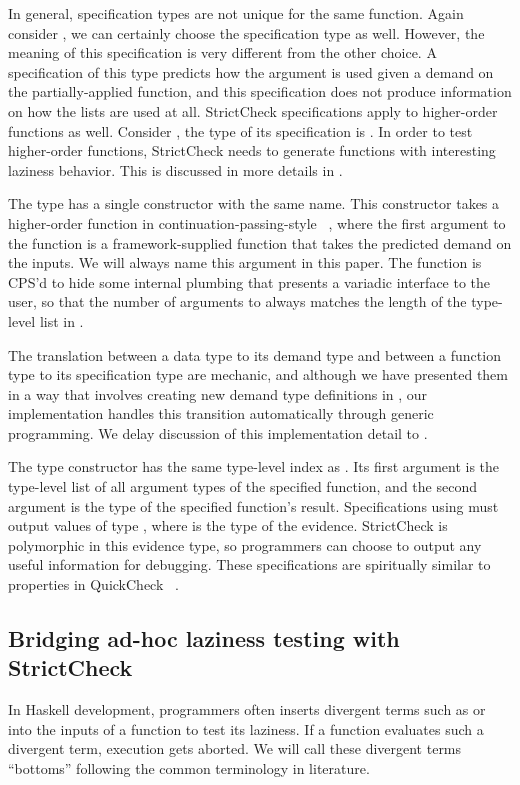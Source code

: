 \documentclass[acmsmall,review]{acmart}\settopmatter{}
\begin{document}
In general, specification types are not unique for the same
function. Again consider , we can certainly choose the
specification type  as well. However, the
meaning of this specification is very different from the other
choice. A specification of this type predicts how the 
argument is used given a demand on the partially-applied 
function, and this specification does not produce information on how
the lists are used at all. StrictCheck specifications apply to
higher-order functions as well. Consider , the type of its specification is . In order to test higher-order functions, StrictCheck needs to
generate functions with interesting laziness behavior. This is
discussed in more details in .

The  type has a single constructor with the same name. This
constructor takes a higher-order function in
continuation-passing-style ~\cn, where the first argument to the
function is a framework-supplied function that takes the predicted
demand on the inputs. We will always name this argument 
in this paper. The function is CPS'd to hide some internal plumbing
that presents a variadic interface to the user, so that the number of
arguments to  always matches the length of the type-level
list in .

The translation between a data type to its demand type and between a
function type to its specification type are mechanic, and although we
have presented them in a way that involves creating new demand type
definitions in , our implementation handles this
transition automatically through generic programming. We delay
discussion of this implementation detail
to .

The  type constructor has the same type-level index
as . Its first argument is the type-level list of all
argument types of the specified function, and the second argument is
the type of the specified function's result. Specifications
using  must output values of type ,
where  is the type of the evidence. StrictCheck is polymorphic
in this evidence type, so programmers can choose to output any useful
information for debugging. These specifications are spiritually
similar to properties in QuickCheck
~\cite{Claessen:2000:QLT:357766.351266}.

\subsection{Bridging ad-hoc laziness testing with StrictCheck}
In Haskell development, programmers often inserts divergent terms such
as  or  into the inputs of a function to test
its laziness. If a function evaluates such a divergent term, execution
gets aborted. We will call these divergent terms ``bottoms'' following
the common terminology in literature.
\end{document}
